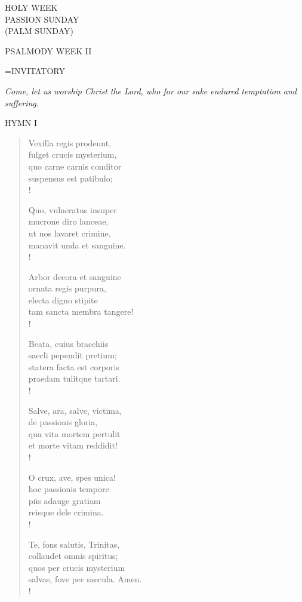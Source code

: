 \begin{center}\normalsize HOLY WEEK\\
\footnotesize PASSION SUNDAY\\
\footnotesize (PALM SUNDAY)\\
\end{center}

PSALMODY WEEK II

\hangindent=\parindent \small{INVITATORY}
\begin{center}
\textit{Come, let us worship Christ the Lord, who for our sake endured temptation and suffering.\\}
\end{center}

\noindent\small{\uppercase{Hymn I}}\normalsize
\begin{verse}
Vexilla regis prodeunt,\\
fulget crucis mysterium,\\
quo carne carnis conditor\\
suspensus est patibulo;\\!

Quo, vulneratus insuper \\
mucrone diro lanceae,\\
ut nos lavaret crimine,\\
manavit unda et sanguine.\\!

Arbor decora et sanguine\\
ornata regis purpura,\\
electa digno stipite\\
tam sancta membra tangere!\\!

Beata, cuius bracchiis\\
saecli pependit pretium;\\
statera facta est corporis\\
praedam tulitque tartari.\\!

Salve, ara, salve, victima,\\
de passionis gloria,\\
qua vita mortem pertulit\\
et morte vitam reddidit!\\!

O crux, ave, spes unica!\\
hoc passionis tempore\\
piis adauge gratiam\\
reisque dele crimina.\\!

Te, fons salutis, Trinitas,\\
collaudet omnis spiritus;\\
quos per crucis mysterium\\
salvas, fove per saecula. Amen.\\!
\end{verse}

